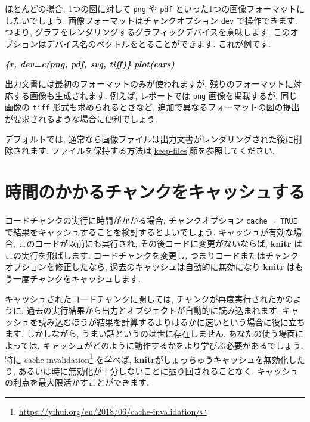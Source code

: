 \documentclass[
  11pt,
  lualatex,
  ja=standard]{bxjsreport}
\newenvironment{Shaded}{\begin{snugshade}}{\end{snugshade}}
\newcommand{\InformationTok}[1]{\textcolor[rgb]{0.56,0.35,0.01}{\textbf{\textit{#1}}}}
\renewcommand{\href}[2]{#2\footnote{\url{#1}}}
\begin{document}
ほとんどの場合, 1つの図に対して \texttt{png} や \texttt{pdf} といった1つの画像フォーマットにしたいでしょう. 画像フォーマットはチャンクオプション \texttt{dev} で操作できます. つまり, グラフをレンダリングするグラフィックデバイスを意味します. このオプションはデバイス名のベクトルをとることができます. これが例です.

\begin{Shaded}
\begin{Highlighting}[]
\InformationTok{\textasciigrave{}\textasciigrave{}\textasciigrave{}\{r, dev=c(\textquotesingle{}png\textquotesingle{}, \textquotesingle{}pdf\textquotesingle{}, \textquotesingle{}svg\textquotesingle{}, \textquotesingle{}tiff\textquotesingle{})\}}
\InformationTok{plot(cars)}
\InformationTok{\textasciigrave{}\textasciigrave{}\textasciigrave{}}
\end{Highlighting}
\end{Shaded}

出力文書には最初のフォーマットのみが使われますが, 残りのフォーマットに対応する画像も生成されます. 例えば, レポートでは \texttt{png} 画像を掲載するが, 同じ画像の \texttt{tiff} 形式も求められるときなど, 追加で異なるフォーマットの図の提出が要求されるような場合に便利でしょう.

デフォルトでは, 通常なら画像ファイルは出力文書がレンダリングされた後に削除されます. ファイルを保持する方法は\ref{keep-files}節を参照してください.

\hypertarget{cache}{%
\section{時間のかかるチャンクをキャッシュする}\label{cache}}

コードチャンクの実行に時間がかかる場合, チャンクオプション \texttt{cache = TRUE} で結果をキャッシュすることを検討するとよいでしょう. キャッシュが有効な場合, このコードが以前にも実行され, その後コードに変更がないならば, \textbf{knitr} はこの実行を飛ばします. コードチャンクを変更し, つまりコードまたはチャンクオプションを修正したなら, 過去のキャッシュは自動的に無効になり \textbf{knitr} はもう一度チャンクをキャッシュします.

キャッシュされたコードチャンクに関しては, チャンクが再度実行されたかのように, 過去の実行結果から出力とオブジェクトが自動的に読み込まれます. キャッシュを読み込むほうが結果を計算するよりはるかに速いという場合に役に立ちます. しかしながら, うまい話というのは世に存在しません. あなたの使う場面によっては, キャッシュがどのように動作するかをより学びぶ必要があるでしょう. 特に \href{https://yihui.org/en/2018/06/cache-invalidation/}{cache invalidation} を学べば, \textbf{knitr}がしょっちゅうキャッシュを無効化したり, あるいは時に無効化が十分しないことに振り回されることなく, キャッシュの利点を最大限活かすことができます.
\end{document}
